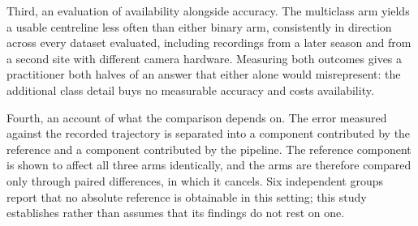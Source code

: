 Third, an evaluation of availability alongside accuracy. The multiclass arm
yields a usable centreline less often than either binary arm, consistently in
direction across every dataset evaluated, including recordings from a later
season and from a second site with different camera hardware. Measuring both
outcomes gives a practitioner both halves of an answer that either alone would
misrepresent: the additional class detail buys no measurable accuracy and
costs availability.

Fourth, an account of what the comparison depends on. The error measured
against the recorded trajectory is separated into a component contributed by
the reference and a component contributed by the pipeline. The reference
component is shown to affect all three arms identically, and the arms are
therefore compared only through paired differences, in which it cancels. Six
independent groups report that no absolute reference is obtainable in this
setting; this study establishes rather than assumes that its findings do not
rest on one.